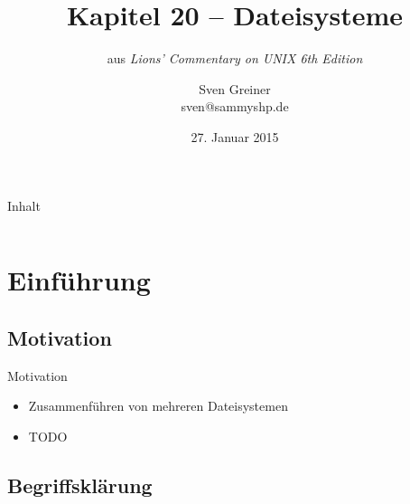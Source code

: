 \documentclass{beamer}
\title{Kapitel 20 -- Dateisysteme}
\subtitle{aus \emph{Lions' Commentary on UNIX 6th Edition}}
\author{Sven Greiner\\\footnotesize\ttfamily sven@sammyshp.de}
\date{27. Januar 2015}
\begin{document}


\begin{frame}[plain]
    \titlepage
\end{frame}




\begin{frame}[plain]{Inhalt}
    \label{TableOfContents}
    \vfill
    \begin{columns}[t]
        \begin{column}{.5\textwidth}
            \tableofcontents[sections={1}]
        \end{column}
        \begin{column}{.5\textwidth}
            \tableofcontents[sections={2}]
        \end{column}
    \end{columns}
    \vfill
\end{frame}




\section{Einführung}

\begin{frame}[plain]
    \sectionpage
\end{frame}




\subsection{Motivation}

\begin{frame}{Motivation}
    \begin{itemize}
        \item Zusammenführen von mehreren Dateisystemen
        \item TODO
    \end{itemize}
\end{frame}




\subsection{Begriffsklärung}
\end{document}
